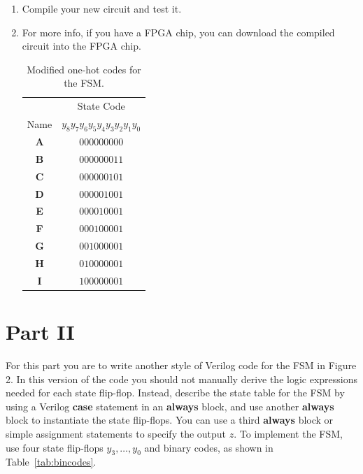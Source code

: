 \documentclass[epsfig,10pt,fullpage]{article}
\begin{document}
\begin{enumerate}
\item Compile your new circuit and test it.

\item For more info, if you have a FPGA chip, you can download the compiled circuit into the FPGA chip.

\begin{table}[H]
\begin{center}
\begin{tabular}{c|c}
~ & State Code \\ 
Name & $y_8 y_7 y_6 y_5 y_4 y_3 y_2 y_1 y_0$ \\ \hline
\rule[-0.075in]{0in}{0.25in}{\bf A} & $000000000$ \\ 
{\bf B} & $000000011$ \\ 
{\bf C} & $000000101$ \\ 
{\bf D} & $000001001$ \\ 
{\bf E} & $000010001$ \\ 
{\bf F} & $000100001$ \\ 
{\bf G} & $001000001$ \\ 
{\bf H} & $010000001$ \\ 
{\bf I} & $100000001$ \\
\end{tabular}
\end{center}
\caption{Modified one-hot codes for the FSM.}
\label{tab:modified_state_assignment}
\end{table}

\end{enumerate}

\section*{Part II}
For this part you are to write another style of Verilog code for the FSM in Figure 2. In
this version of the code you should not manually derive the logic expressions needed for
each state flip-flop. Instead, describe the state table for the FSM by using a
Verilog {\bf case} statement in an {\bf always} block, and use another {\bf always} block to
instantiate the state flip-flops. You can use a third {\bf always} block or simple assignment
statements to specify the output $z$. To implement the FSM, use four state flip-flops
$y_3, \ldots, y_0$ and binary codes, as shown in Table~\ref{tab:bincodes}.
\end{document}
